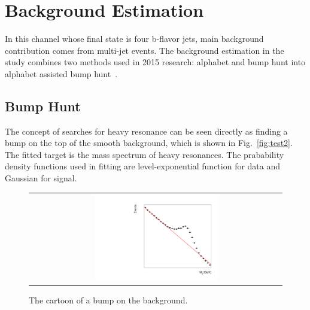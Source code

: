
\chapter{Background Estimation} \label{chap:4}
In this channel whose final state is four b-flavor jets, main background contribution comes from multi-jet events.
The background estimation in the study combines two methods used in 2015 research: alphabet and bump hunt into alphabet assisted bump hunt~\citep{CMS-PAS-B2G-16-008}.
 

\section{Bump Hunt}
The concept of searches for heavy resonance can be seen directly as finding a bump on the top of the smooth background, which is shown in Fig.~\ref{fig:test2}. The fitted target is the mass spectrum of heavy resonances. The prabability density functions used in fitting are level-exponential function for data and Gaussian for signal.
\begin{figure}[t]
  \centering
  \begin{tabular}{c}
    \includegraphics[width=0.5\textwidth]{Figures/cart.pdf} 
   
  \end{tabular}
  \caption{The cartoon of a bump on the background.}
  \label{fig:hvt_brs}
\end{figure}
\label{fig:test2}
